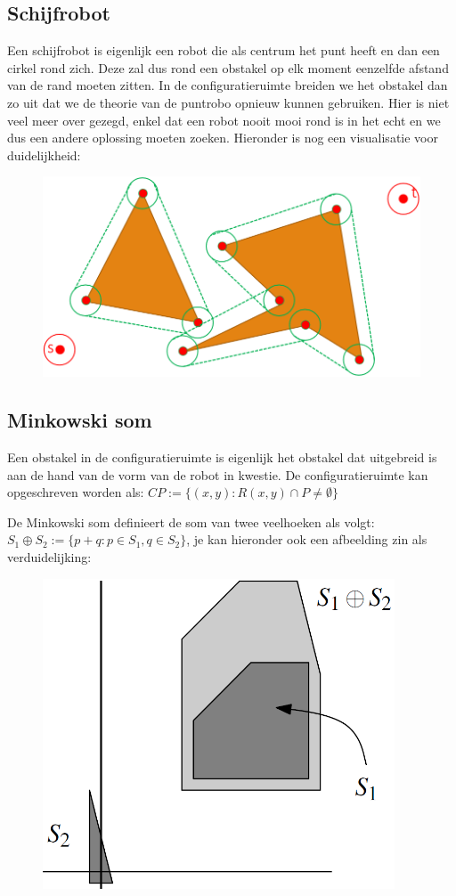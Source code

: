 \documentclass[12pt,a4paper]{article}
\begin{document}
	\subsection{Schijfrobot}
	Een schijfrobot is eigenlijk een robot die als centrum het punt heeft en dan een cirkel rond zich. Deze zal dus rond een obstakel op elk moment eenzelfde afstand van de rand moeten zitten. In de configuratieruimte breiden we het obstakel dan zo uit dat we de theorie van de puntrobo opnieuw kunnen gebruiken. Hier is niet veel meer over gezegd, enkel dat een robot nooit mooi rond is in het echt en we dus een andere oplossing moeten zoeken. Hieronder is nog een visualisatie voor duidelijkheid: 
	\begin{figure}[H]
		\centering
		\includegraphics[width=0.6\linewidth]{afbeeldingen/Motion-plannine/schijfrobot}
		\label{fig:schijfrobot}
	\end{figure}
	
	
	\subsection{Minkowski som}
	Een obstakel in de configuratieruimte is eigenlijk het obstakel dat uitgebreid is aan de hand van de vorm van de robot in kwestie. De configuratieruimte kan opgeschreven worden als: \(CP := \{(x, y) : R(x, y) \cap P \neq \emptyset\}\)
	
	De Minkowski som definieert de som van twee veelhoeken als volgt: \(S_1 \oplus S_2 := \{p+q : p \in S_1, q \in S_2\}\), je kan hieronder ook een afbeelding zin als verduidelijking: 
	\begin{figure}[H]
		\centering
		\includegraphics[width=0.4\linewidth]{afbeeldingen/Motion-plannine/Minkowski-som}
		\label{fig:minkowski-som}
	\end{figure}
\end{document}
